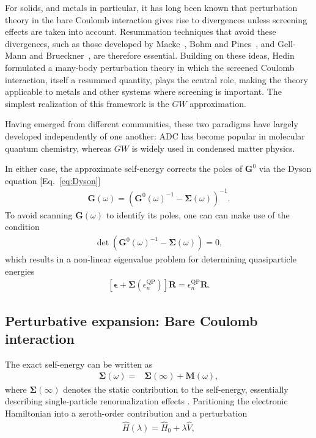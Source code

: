\documentclass[aip,jcp,reprint,noshowkeys,superscriptaddress]{revtex4-2}
\newcommand{\bG}{\boldsymbol{G}}
\newcommand{\bM}{\boldsymbol{M}}
\begin{document}
For solids, and metals in particular, it has long been known that perturbation theory in the bare Coulomb interaction gives rise to divergences unless screening effects are taken into account.
Resummation techniques that avoid these divergences, such as those developed by Macke~\cite{Macke_1950}, Bohm and Pines~\cite{Bohm_1953}, and Gell-Mann and Brueckner~\cite{GellMann_1957}, are therefore essential.
Building on these ideas, Hedin formulated a many-body perturbation theory in which the screened Coulomb interaction, itself a resummed quantity, plays the central role, making the theory applicable to metals and other systems where screening is important.
The simplest realization of this framework is the $GW$ approximation.

Having emerged from different communities, these two paradigms have largely developed independently of one another: ADC has become popular in molecular quantum chemistry, whereas $GW$ is widely used in condensed matter physics.

In either case, the approximate self-energy corrects the poles of $\bG^0$ via the Dyson equation [Eq.~\eqref{eq:Dyson}]
\begin{align}
    \bG(\omega) = (\bG^0(\omega)^{-1} - \pmb{\Sigma}(\omega))^{-1}.
\end{align}
To avoid scanning $\bG(\omega)$ to identify its poles, one can can make use of the condition
\begin{align}
    \det(\bG^0(\omega)^{-1} - \pmb{\Sigma}(\omega)) = 0,
\end{align}
which results in a non-linear eigenvalue problem for determining quasiparticle energies 
\begin{align}
    \left[ \pmb{\epsilon} + \pmb{\Sigma}(\epsilon^\mathrm{QP}_n) \right] \mathbf{R} = \epsilon^\mathrm{QP}_n \mathbf{R}.
    \label{eq:QP_eigenvalue}
\end{align}

\subsection{Perturbative expansion: Bare Coulomb interaction}
The exact self-energy can be written as
\begin{align}
    \pmb{\Sigma}(\omega) =& \pmb{\Sigma}(\infty) + \bM(\omega),
    \label{eq:SigmaADC}
\end{align}
where $\pmb{\Sigma}(\infty)$ denotes the static contribution to the self-energy, essentially describing single-particle renormalization effects \cite{Schirmer_2018}.
Paritioning the electronic Hamiltonian into a zeroth-order contribution and a perturbation 
\begin{align}
    \hat{H}(\lambda) = \hat{H}_0 + \lambda \hat{V},
\end{align}
\end{document}
